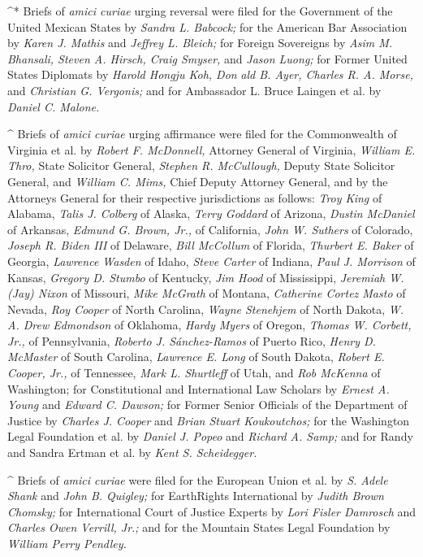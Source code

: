 ^* Briefs of \emph{amici curiae} urging reversal were filed for the
Government of the United Mexican States by \emph{Sandra L. Babcock;} for
the American Bar Association by \emph{Karen J. Mathis} and \emph{Jeffrey L.
Bleich;} for Foreign Sovereigns by \emph{Asim M. Bhansali, Steven A.
Hirsch, Craig Smyser,} and \emph{Jason Luong;} for Former United States
Diplomats by \emph{Harold Hongju Koh, Don} \newpage  \emph{ald B. Ayer, Charles
R. A. Morse,} and \emph{Christian G. Vergonis;} and for Ambassador L.
Bruce Laingen et al. by \emph{Daniel C. Malone.}

^   Briefs of \emph{amici curiae} urging affirmance were filed for the
Commonwealth of Virginia et al. by \emph{Robert F. McDonnell,} Attorney
General of Virginia, \emph{William E. Thro,} State Solicitor General,
\emph{Stephen R. McCullough,} Deputy State Solicitor General, and \emph{William
C. Mims,} Chief Deputy Attorney General, and by the Attorneys General
for their respective jurisdictions as follows: \emph{Troy King} of Alabama,
\emph{Talis J. Colberg} of Alaska, \emph{Terry Goddard} of Arizona, \emph{Dustin
McDaniel} of Arkansas, \emph{Edmund G. Brown, Jr.,} of California, \emph{John
W. Suthers} of Colorado, \emph{Joseph R. Biden III} of Delaware, \emph{Bill
McCollum} of Florida, \emph{Thurbert E. Baker} of Georgia, \emph{Lawrence
Wasden} of Idaho, \emph{Steve Carter} of Indiana, \emph{Paul J. Morrison} of
Kansas, \emph{Gregory D. Stumbo} of Kentucky, \emph{Jim Hood} of Mississippi,
\emph{Jeremiah W. (Jay) Nixon} of Missouri, \emph{Mike McGrath} of Montana,
\emph{Catherine Cortez Masto} of Nevada, \emph{Roy Cooper} of North Carolina,
\emph{Wayne Stenehjem} of North Dakota, \emph{W. A. Drew Edmondson} of
Oklahoma, \emph{Hardy Myers} of Oregon, \emph{Thomas W. Corbett, Jr.,} of
Pennsylvania, \emph{Roberto J. Sánchez-Ramos} of Puerto Rico, \emph{Henry D.
McMaster} of South Carolina, \emph{Lawrence E. Long} of South Dakota,
\emph{Robert E. Cooper, Jr.,} of Tennessee, \emph{Mark L. Shurtleff} of Utah,
and \emph{Rob McKenna} of Washington; for Constitutional and International
Law Scholars by \emph{Ernest A. Young} and \emph{Edward C. Dawson;} for Former
Senior Officials of the Department of Justice by \emph{Charles J. Cooper}
and \emph{Brian Stuart Koukoutchos;} for the Washington Legal Foundation et
al. by \emph{Daniel J. Popeo} and \emph{Richard A. Samp;} and for Randy and
Sandra Ertman et al. by \emph{Kent S. Scheidegger.}

^   Briefs of \emph{amici curiae} were filed for the European Union et
al. by \emph{S. Adele Shank} and \emph{John B. Quigley;} for EarthRights
International by \emph{Judith Brown Chomsky;} for International Court of
Justice Experts by \emph{Lori Fisler Damrosch} and \emph{Charles Owen Verrill,
Jr.;} and for the Mountain States Legal Foundation by \emph{William Perry
Pendley.}
